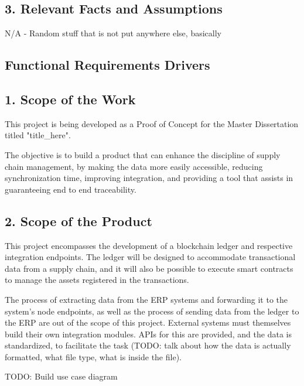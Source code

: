         \subsection*{3. Relevant Facts and Assumptions}
		\par N/A - Random stuff that is not put anywhere else, basically
	

\subsection{Functional Requirements Drivers}
\subsection*{1. Scope of the Work}
		\par This project is being developed as a Proof of Concept for the Master Dissertation titled "title\_here". 

		\par The objective is to build a product that can enhance the discipline of supply chain management, by making the data more easily accessible, reducing synchronization time, improving integration, and providing a tool that assists in guaranteeing end to end traceability.
\subsection*{2. Scope of the Product}
		\par This project encompasses the development of a blockchain ledger and respective integration endpoints. The ledger will be designed to accommodate transactional data from a supply chain, and it will also be possible to execute smart contracts to manage the assets registered in the transactions.
		\par The process of extracting data from the ERP systems and forwarding it to the system's node endpoints, as well as the process of sending data from the ledger to the ERP are out of the scope of this project. External systems must themselves build their own integration modules. APIs for this are provided, and the data is standardized, to facilitate the task (TODO: talk about how the data is actually formatted, what file type, what is inside the file).
		\par TODO: Build use case diagram
	

